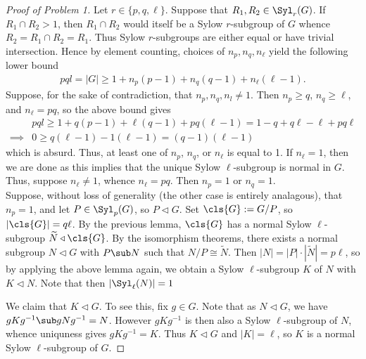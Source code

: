 \documentclass[12pt]{article}
\begin{document}
\begin{homeworkProblem}
\begin{proof}[Proof of Problem 1]
    Let $ r\in \{p,q,\ell\} $. Suppose that $ R_{1},R_{2}\in \Syl_{r}(G) $. If $ R_{1}\cap R_{2} > {1} $, then $ R_{1}\cap R_{2} $ would itself be a Sylow $ r $-subgroup of $ G $ whence $R_{2} = R_{1}\cap R_{2} = R_{1} $. Thus Sylow $ r $-subgroups are either equal or have trivial intersection. Hence by element counting, choices of $ n_{p}, n_{q},n_{\ell} $ yield the following lower bound
    \begin{align*}
      pql = |G| \geq 1+n_{p}(p-1) + n_{q}(q-1) + n_{\ell}(\ell-1).
    \end{align*}
    Suppose, for the sake of contradiction, that $ n_{p},n_{q},n_{l}\neq 1 $. Then $ n_{p}\geq q $, $ n_{q}\geq \ell $, and $ n_{\ell}=pq $, so the above bound gives
    \begin{align*}
      &pql \geq 1+ q(p-1) + \ell(q-1) + pq(\ell-1) = 1-q+q\ell-\ell+pq\ell \\
      \implies& 0\geq q(\ell-1)-1(\ell-1) = (q-1)(\ell-1) 
    \end{align*}
    which is absurd. Thus, at least one of $ n_{p} $, $ n_{q} $, or $ n_{\ell} $ is equal to 1. If $ n_{\ell}=1 $, then we are done as this implies that the unique Sylow $ \ell $-subgroup is normal in $ G $. Thus, suppose $ n_{\ell}\neq 1 $, whence $ n_{\ell}=pq $. Then $ n_{p}=1 $ or $ n_{q}=1 $. \\

    Suppose, without loss of generality (the other case is entirely analagous), that $ n_{p}=1 $, and let $ P\in \Syl_{p}(G) $, so $ P\triangleleft G $. Set $ \cls{G}:=G/P $, so $ |\cls{G}| = q\ell $. By the previous lemma, $ \cls{G} $ has a normal Sylow $ \ell $-subgroup $ \widetilde{N}\triangleleft \cls{G}$. By the isomorphism theorems, there exists a normal subgroup $ N\triangleleft G $ with $ P\sub N $ such that $ N/P \cong \widetilde{N} $. Then $ |N| = |P|\cdot|\widetilde{N}| = p\ell $, so by applying the above lemma again, we obtain a Sylow $ \ell $-subgroup $ K $ of $ N $ with $ K\triangleleft N $. Note that then $|\Syl_{\ell}(N)|=1  $

    We claim that $ K\triangleleft G $. To see this, fix $ g\in G $. Note that as $ N\triangleleft G $, we have $ gKg^{-1}\sub gNg^{-1}= N $. However $ gKg^{-1} $ is then also a Sylow $ \ell $-subgroup of $ N $, whence uniquness gives $ gKg^{-1} = K $. Thus $ K\triangleleft G $ and $ |K|=\ell $, so $ K $ is a normal Sylow $ \ell $-subgroup of $ G $.
    
  \end{proof}

\end{homeworkProblem}
\end{document}

